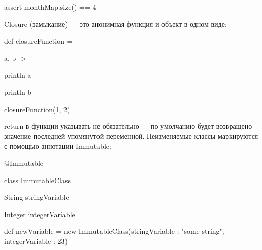 \documentclass[14pt,article]{scrartcl}
\begin{document}
assert monthMap.size() == 4{}

Closure (замыкание) — это анонимная функция и объект в одном виде:{}

def closureFunction = {a, b ->{}

    println a{}

    println b{}

}

closureFunction(1, 2){}

return в функции указывать не обязательно — по умолчанию будет возвращено значение последней упомянутой переменной.
Неизменяемые классы маркируются с помощью аннотации Immutable:{}

@Immutable{}

class ImmutableClass {{}

    String stringVariable{}

    Integer integerVariable{}

}
def newVariable = new ImmutableClass(stringVariable : "some string", integerVariable : 23){}
\end{document}
